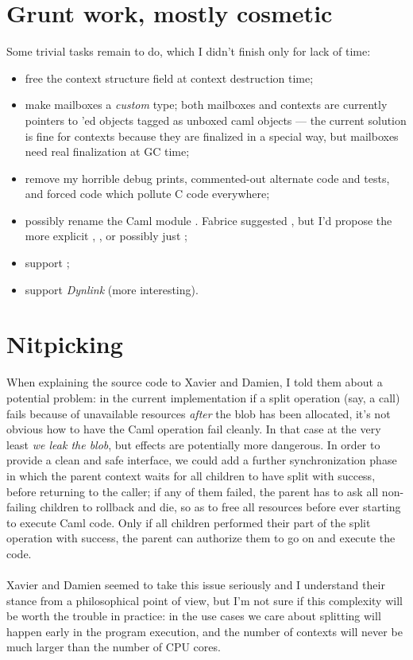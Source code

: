 \documentclass[a4paper,twoside,12pt]{article}
\begin{document}
\section{Grunt work, mostly cosmetic}
Some trivial tasks remain to do, which I didn't finish only for lack of time:
\begin{itemize}
\item free the context structure field at context destruction time;
\item make mailboxes a \textit{custom} type; both mailboxes and
  contexts are currently pointers to 'ed objects tagged
  as unboxed caml objects --- the current solution is fine for
  contexts because they are finalized in a special way, but mailboxes
  need real finalization at GC time;
\item remove my horrible debug prints, commented-out alternate code
  and tests, and forced  code
  which pollute C code everywhere;
\item possibly rename the Caml module .  Fabrice
  suggested , but I'd propose the more explicit
  , , or possibly just ;
\item support ;
\item support \textit{Dynlink} (more interesting).
\end{itemize}

\section{Nitpicking}
When explaining the source code to Xavier and Damien, I told them
about a potential problem: in the current implementation if a split
operation (say, a  call) fails because of
unavailable resources \textit{after} the blob has been allocated, it's
not obvious how to have the Caml  operation fail cleanly.
In that case at the very least \textit{we leak the blob}, but effects
are potentially more dangerous.  In order to provide a clean and safe
interface, we could add a further synchronization phase in which the
parent context waits for all children to have split with success,
before returning to the caller; if any of them failed, the parent has
to ask all non-failing children to rollback and die, so as to free all
resources before ever starting to execute Caml code.  Only if all
children performed their part of the split operation with success, the
parent can authorize them to go on and execute the code.
\\
\\
Xavier and Damien seemed to take this issue seriously and I understand
their stance from a philosophical point of view, but I'm not sure if
this complexity will be worth the trouble in practice: in the use
cases we care about splitting will happen early in the program
execution, and the number of contexts will never be much larger than
the number of CPU cores.
\end{document}
